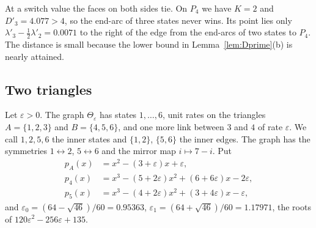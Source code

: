 At a switch value the faces on both sides tie. On $P_4$ we have $K=2$ and
$D'_3=4.077>4$, so the end-arc of three states never wins. Its point lies
only $\lambda'_3-\frac12\lambda'_2=0.0071$ to the right of the edge from the
end-arcs of two states to $P_4$. The distance is small because the lower bound
in Lemma~\ref{lem:Dprime}(b) is nearly attained.

\subsection{Two triangles}\label{app:triangles}

Let $\varepsilon>0$. The graph $\Theta_\varepsilon$ has states $1,\dots,6$,
unit rates on the triangles $A=\{1,2,3\}$ and $B=\{4,5,6\}$, and one more link
between $3$ and $4$ of rate $\varepsilon$. We call $1,2,5,6$ the inner states
and $\{1,2\}$, $\{5,6\}$ the inner edges. The graph has the symmetries
$1\leftrightarrow2$, $5\leftrightarrow6$ and the mirror map $i\mapsto7-i$. Put
\begin{align*}
 p_A(x)&=x^2-(3+\varepsilon)x+\varepsilon,\\
 p_4(x)&=x^3-(5+2\varepsilon)x^2+(6+6\varepsilon)x-2\varepsilon,\\
 p_5(x)&=x^3-(4+2\varepsilon)x^2+(3+4\varepsilon)x-\varepsilon,
\end{align*}
and $\varepsilon_0=(64-\sqrt{46})/60=0.95363$,
$\varepsilon_1=(64+\sqrt{46})/60=1.17971$, the roots of
$120\varepsilon^2-256\varepsilon+135$.

